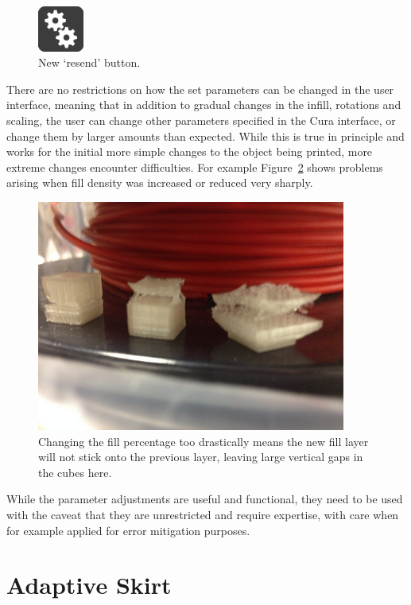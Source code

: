 \documentclass[11pt]{report} %
\begin{document}
\begin{figure}[H]
  \centering
  \includegraphics[width=1.5cm]{NewButton.png}
  \caption{New `resend' button.}
  \label{figure:NewButton}
\end{figure}

There are no restrictions on how the set parameters can be changed in the user interface, meaning that in addition to gradual changes in the infill, rotations and scaling, the user can change other parameters specified in the Cura interface, or change them by larger amounts than expected. While this is true in principle and works for the initial more simple changes to the object being printed, more extreme changes encounter difficulties. For example Figure~\ref{figure:MissingLayers} shows problems arising when fill density was increased or reduced very sharply.

\begin{figure}[H]
  \centering
  \includegraphics[width=4in]{MissingLayers.png}
  \caption{Changing the fill percentage too drastically means the new fill layer will not stick onto the previous layer, leaving large vertical gaps in the cubes here.}
  \label{figure:MissingLayers}
\end{figure}

While the parameter adjustments are useful and functional, they need to be used with the caveat that they are unrestricted and require expertise, with care when for example applied for error mitigation purposes.






\section{Adaptive Skirt}
\label{section:AdaptiveSkirt}
\end{document}
